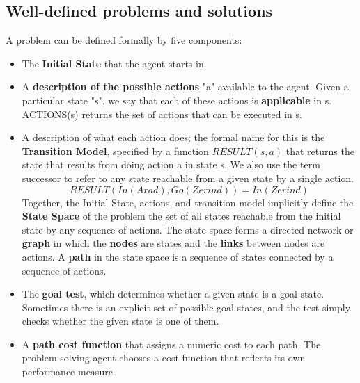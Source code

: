 \subsection{Well-defined problems and solutions}
A problem can be defined formally by five components:
\begin{itemize}
  \item The \textbf{Initial State} that the agent starts in.
  \item A \textbf{description of the possible actions} "a" available to the agent. Given a particular state "s", we say that each of these actions is \textcolor{CadetBlue!90}{\textbf{applicable}} in s.
    ACTIONS(s) returns the set of actions that can be executed in s.
  \item A description of what each action does; the formal name for this is the \textbf{Transition Model}, specified by a function $RESULT(s, a)$ that returns the state that results from doing action a in state s. We also use the term successor to refer to any state reachable from a given state by a single action.
\[RESULT(In(Arad),Go(Zerind)) = In(Zerind)\]
  Together, the Initial State, actions, and transition model implicitly define the \textcolor{CadetBlue!90}{\textbf{State Space}} of the problem the set of all states reachable from the initial state by any sequence of actions. The state space forms a directed network or \textcolor{CadetBlue!90}{\textbf{graph}} in which the \textcolor{CadetBlue!90}{\textbf{nodes}} are states and the \textcolor{CadetBlue!90}{\textbf{links}} between nodes are actions.
  A \textcolor{CadetBlue!90}{\textbf{path}} in the state space is a sequence of states connected by a sequence of actions.
  \item The \textbf{goal test}, which determines whether a given state is a goal state. Sometimes there is an explicit set of possible goal states, and the test simply checks whether the given state is one of them.
  \item A \textbf{path cost function} that assigns a numeric cost to each path. The problem-solving agent chooses a cost function that reflects its own performance measure.
\end{itemize}


